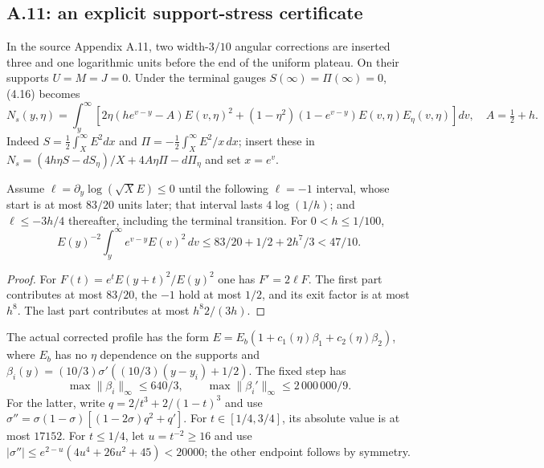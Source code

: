 \subsection*{A.11: an explicit support-stress certificate}
\label{subsec:A11-support}
In the source Appendix A.11, two width-$3/10$ angular corrections
are inserted three and one logarithmic units before the end of the
uniform plateau. On their supports $U=M=J=0$. Under the terminal
gauges $S(\infty)=\Pi(\infty)=0$, (4.16) becomes
\begin{equation}\label{eq:A11-Ns-exact}
N_s(y,\eta)=\int_y^\infty\left[
2\eta(h e^{v-y}-A)E(v,\eta)^2+
(1-\eta^2)(1-e^{v-y})E(v,\eta)E_\eta(v,\eta)
\right]dv,
\quad A=\tfrac12+h.
\end{equation}
Indeed $S=\frac12\int_X^\infty E^2dx$ and
$\Pi=-\frac12\int_X^\infty E^2/x\,dx$; insert these in
$N_s=(4h\eta S-dS_\eta)/X+4A\eta\Pi-d\Pi_\eta$
and set $x=e^v$.

\begin{lemma}
Assume $\ell=\partial_y\log(\sqrt X E)\le0$
until the following $\ell=-1$ interval, whose start is at most
$83/20$ units later; that interval lasts $4\log(1/h)$; and
$\ell\le-3h/4$ thereafter, including the terminal transition.
For $0<h\le1/100$,
\begin{equation}\label{eq:A11-future-energy}
E(y)^{-2}\int_y^\infty e^{v-y}E(v)^2\,dv
\le83/20+1/2+2h^7/3<47/10.
\end{equation}
\end{lemma}
\begin{proof}
For $F(t)=e^tE(y+t)^2/E(y)^2$ one has $F'=2\ell F$.
The first part contributes at most $83/20$, the $-1$ hold
at most $1/2$, and its exit factor is at most $h^8$.
The last part contributes at most $h^8 2/(3h)$.
\end{proof}

The actual corrected profile has the form
$E=E_b(1+c_1(\eta)\beta_1+c_2(\eta)\beta_2)$,
where $E_b$ has no $\eta$ dependence on the supports and
$\beta_i(y)=(10/3)\sigma'((10/3)(y-y_i)+1/2)$.
The fixed step has
\begin{equation}\label{eq:A11-bump-C1}
\max\|\beta_i\|_\infty\le640/3,\qquad
\max\|\beta_i'\|_\infty\le2\,000\,000/9.
\end{equation}
For the latter, write
$q=2/t^3+2/(1-t)^3$ and use
$\sigma''=\sigma(1-\sigma)[(1-2\sigma)q^2+q']$.
For $t\in[1/4,3/4]$, its absolute value is at most $17152$.
For $t\le1/4$, let $u=t^{-2}\ge16$ and use
$|\sigma''|\le e^{2-u}(4u^4+26u^2+45)<20000$;
the other endpoint follows by symmetry.

